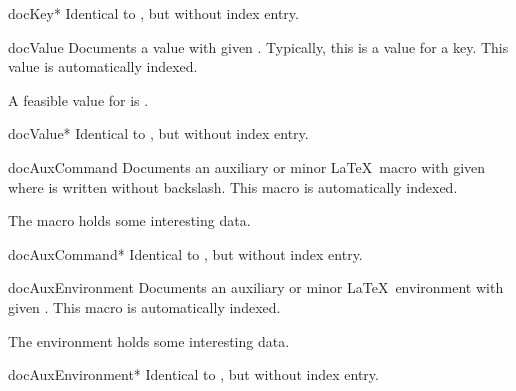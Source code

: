 \begin{docEnvironment}[doclang/environment content=key description,doc updated=2014-09-29]{docKey*}{}
  Identical to , but without index entry.
\end{docEnvironment}


\begin{docCommand}{docValue}{}
  Documents a value with given . Typically, this is a value for a key.
  This value is automatically indexed.
\begin{dispExample}
A feasible value for  is .
\end{dispExample}
\end{docCommand}


\begin{docCommand}{docValue*}{}
  Identical to , but without index entry.
\end{docCommand}


\begin{docCommand}[doc updated=2014-10-09]{docAuxCommand}{}
  Documents an auxiliary or minor \LaTeX\ macro with given 
  where  is written without backslash.
  This macro is automatically indexed.
\begin{dispExample}
The macro  holds some interesting data.
\end{dispExample}
\end{docCommand}

\begin{docCommand}[doc updated=2014-10-09]{docAuxCommand*}{}
  Identical to , but without index entry.
\end{docCommand}

\begin{docCommand}{docAuxEnvironment}{}
  Documents an auxiliary or minor \LaTeX\ environment with given .
  This macro is automatically indexed.
\begin{dispExample}
The environment  holds some interesting data.
\end{dispExample}
\end{docCommand}

\begin{docCommand}{docAuxEnvironment*}{}
  Identical to , but without index entry.
\end{docCommand}

